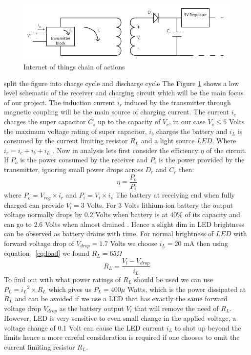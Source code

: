 

\begin{figure}[h!]
\centering
\includegraphics[width=1\textwidth]{design.pdf}
\caption{Internet of things chain of actions}
\label{fig:design1}
\end{figure}

 split the figure into charge cycle and discharge cycle
The Figure \ref{fig:design1}
shows a low level schematic of the receiver and charging circuit which will be the main focus of our project. The induction current $i_r$ induced by the transmitter through magnetic coupling will be the main source of charging current. The current $i_c$ charges the super capacitor $C_s$ up to the capacity of $V_c$, in our case $V_c \leq 5$ Volts the maximum voltage rating of super capacitor, $i_b$ charges the battery and $i_L$ is consumed by the current limiting resistor $R_L$  and a light source $LED$. Where $i_r = i_c + i_b +i_L$ . Now in analysis lets first consider the efficiency ${\eta}$ of the circuit.
If $P_{o}$ is the power consumed by the receiver and $P_{i}$ is the power provided by the transmitter, ignoring small power drops across $D_r$ and $C_r$  then:
\begin{equation}\label{eq:effb}
 {\eta} = \frac{P_o}{P_i}
\end{equation}
where $P_o = V_{reg} \times i_r $ and $P_i = V_i \times i_s $
The battery at receiving end when fully charged can provide $V_l = 3 $ Volts.
For 3 Volts lithium-ion battery the output voltage normally drops by $0.2 $ Volts when battery is at $40 \%$ of its capacity and can go to $2.6 $ Volts when almost drained \cite{IAmp}. Hence a slight dim in LED brightness can be observed as battery drains with time.
For normal brightness of $LED$ with forward voltage drop of $V_{drop} = 1.7 $ Volts we choose $i_L = 20 $ mA then using equation ~\ref{eq:load} we found $R_L = 65 \Omega $
\begin{equation}\label{eq:load}
 R_L = \frac{V_l - V_{drop}}{i_L}
\end{equation}
To find out with what power ratings of $R_L$ should be used we can use $P_L = {i_L}^2 \times R_L $ which gives us $P_L = 400 \mu$ Watts, which is the power dissipated at $R_L$ and can be avoided if we use a LED that has exactly the same forward voltage drop $V_{drop}$ as the battery output $V_l$ that will remove the need of $R_L$. However, LED is very sensitive to even small change in the applied voltage, a voltage change of 0.1 Volt can cause the LED current $i_L$ to shot up beyond the limits hence a more careful consideration is required if one chooses to omit the current limiting resistor $R_L$.
